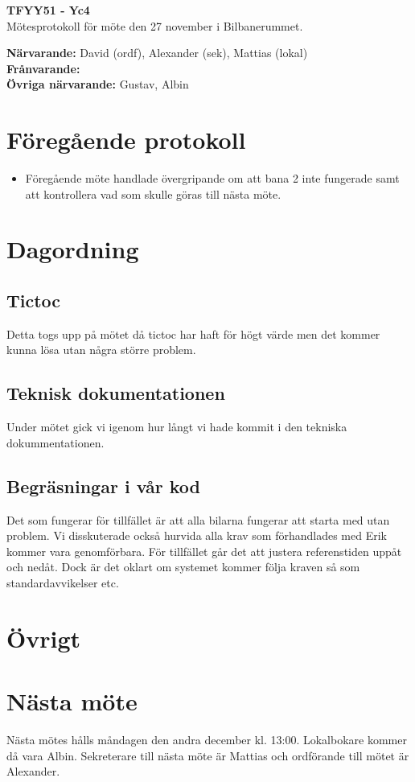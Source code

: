 \documentclass[11pt,a4paper]{article}
\begin{document}
    \begin{center}
        \textbf{\Large TFYY51 - Yc4} \\[0.2em]
        Mötesprotokoll för möte den 27 november i Bilbanerummet.
    \end{center}
    \vspace{1em}
    \textbf{Närvarande:} David (ordf), Alexander (sek), Mattias (lokal) \\[0.5em]
    \textbf{Frånvarande:}  \\[0.5em]  %
    \textbf{Övriga närvarande: }Gustav, Albin

    \section*{Föregående protokoll}
    \begin{itemize}
        \item Föregående möte handlade övergripande om att bana 2 inte fungerade samt att kontrollera vad som skulle göras till nästa möte.\
    \end{itemize}

    \section*{Dagordning}
    \subsection*{Tictoc}
	    Detta togs upp på mötet då tictoc har haft för högt värde men det kommer kunna lösa utan några större problem.
	\subsection*{Teknisk dokumentationen}
	    Under mötet gick vi igenom hur långt vi hade kommit i den tekniska dokummentationen.
	\subsection*{Begräsningar i vår kod}
	 	Det som fungerar för tillfället är att alla bilarna fungerar att starta med utan problem. Vi disskuterade också hurvida alla krav som förhandlades med Erik kommer vara genomförbara. För tillfället går det att justera referenstiden uppåt och nedåt. Dock är det oklart om systemet kommer följa kraven så som standardavvikelser etc. 
    \section*{Övrigt}
    

    \section*{Nästa möte}
    Nästa mötes hålls måndagen den andra december kl. 13:00. Lokalbokare kommer då vara Albin. Sekreterare till nästa möte är Mattias och ordförande till mötet är Alexander.  
\end{document}
